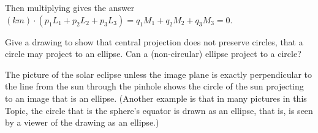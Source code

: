 \begin{exercises}
\begin{answer}
      Then multiplying gives the answer
      $(km)\cdot (p_1L_1+p_2L_2+p_3L_3)=q_1M_1+q_2M_2+q_3M_3=0$.
    \end{answer}
  \item 
    Give a drawing to show that central projection does not preserve 
    circles, that a circle may project to an ellipse.
    Can a (non-circular) ellipse project to a circle?
    \begin{answer}
      The picture of the solar eclipse \Dash  unless 
      the image plane is exactly perpendicular
      to the line from the sun through the pinhole \Dash  shows the circle
      of the sun projecting to an image that is an  ellipse.
      (Another example is that in many pictures in this 
      Topic, the circle that is the sphere's equator is drawn as an ellipse,
      that is, is seen by a viewer of the drawing as an ellipse.)
      

\end{answer}
\end{exercises}
